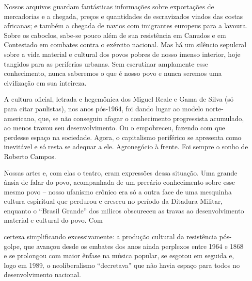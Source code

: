 {Nossos arquivos guardam fantásticas informações sobre exportações de
mercadorias e a chegada, preços e quantidades de escravizados vindos das
costas africanas; e também a chegada de navios com imigrantes europeus
para a lavoura. Sobre os caboclos, sabe-se pouco além de sua resistência em Canudos e em Contestado em combates contra o exército nacional. Mas há um 
silêncio sepulcral sobre a vida material e cultural dos povos pobres de
nosso imenso interior, hoje tangidos para as periferias urbanas. Sem escrutinar amplamente esse conhecimento, nunca saberemos o que é nosso povo e
nunca seremos uma civilização em sua inteireza.

A cultura oficial, letrada e hegemônica dos Miguel Reale e Gama de Silva
(só para citar paulistas), nos anos pós-1964, foi dando lugar ao modelo
norte-americano, que, se não conseguiu afogar o conhecimento progressista
acumulado, ao menos travou seu desenvolvimento. Ou o empobreceu, fazendo com que perdesse
espaço na sociedade. Agora, o capitalismo periférico se apresenta como
inevitável e só resta se adequar a ele. Agronegócio à frente. Foi sempre
o sonho de Roberto Campos.

Nossas artes e, com elas o teatro, eram expressões dessa situação. Uma
grande ânsia de falar do povo, acompanhada de um precário conhecimento
sobre esse mesmo povo -- nosso ufanismo crônico era só a outra face de
uma mesquinha cultura espiritual que perdurou e cresceu no período da
Ditadura Militar, enquanto o “Brasil Grande” dos milicos obscureceu as
travas ao desenvolvimento material e cultural do povo. Com

\column

\noindent{}certeza
simplificando excessivamente: a produção cultural da resistência pós-golpe,
que avançou desde os embates dos anos ainda perplexos entre 1964 e
1868 e se prolongou com maior ênfase na música popular, se esgotou
em seguida e, logo em 1989, o neoliberalismo “decretava” que não havia
espaço para todos no desenvolvimento nacional.


}

